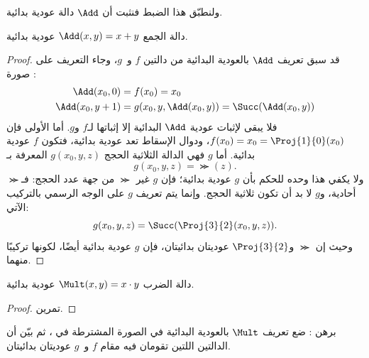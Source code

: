 \documentclass[../../../include/open-logic-section]{subfiles}
\begin{document}
ولنطبّق هذا الضبط فنثبت أن $\Add$ دالة عودية بدائية.

\begin{prop}
  دالة الجمع $\Add(x,y)=x+y$ عودية بدائية.
\end{prop}

\begin{proof}
قد سبق تعريف $\Add$ بالعودية البدائية من دالتين $f$ و~$g$،
وجاء التعريف على صورة :
\begin{align*}
  \Add(x_0, 0) & = f(x_0) = x_0\\
  \Add(x_0, y+1) & = g(x_0, y, \Add(x_0, y)) =
  \Succ(\Add(x_0, y))
\end{align*}
فلا يبقى لإثبات عودية $\Add$ البدائية إلا إثباتها لـ$f$ و$g$. أما الأولى فإن
$f(x_0)=x_0=\Proj{1}{0}(x_0)$، ودوال الإسقاط تعد عودية بدائية، فتكون
$f$ عودية بدائية. أما $g$ فهي الدالة الثلاثية الحجج $g(x_0,y,z)$
المعرفة بـ
\[
g(x_0, y, z) = \Succ(z).
\]
ولا يكفي هذا وحده للحكم بأن $g$ عودية بدائية؛ فإن $g$ غير $\Succ$
من جهة عدد الحجج: فـ$\Succ$ أحادية، و$g$ لا بد أن تكون ثلاثية
الحجج. وإنما يتم تعريف $g$ على الوجه الرسمي بالتركيب الآتي:
\[
g(x_0, y, z) = \Succ(\Proj{3}{2}(x_0, y, z)).
\]
وحيث إن $\Succ$ و$\Proj{3}{2}$ عوديتان بدائيتان، فإن $g$
عودية بدائية أيضًا، لكونها تركيبًا منهما.
\end{proof}

\begin{prop}
  دالة الضرب $\Mult(x,y)=x\cdot y$ عودية بدائية.
\end{prop}

\begin{proof}
  تمرين.
\end{proof}

\begin{prob}
  برهن : ضع تعريف $\Mult$
  بالعودية البدائية في الصورة المشترطة في
  ، ثم بيّن أن الدالتين
  اللتين تقومان فيه مقام $f$ و~$g$ عوديتان بدائيتان.
\end{prob}
\end{document}
